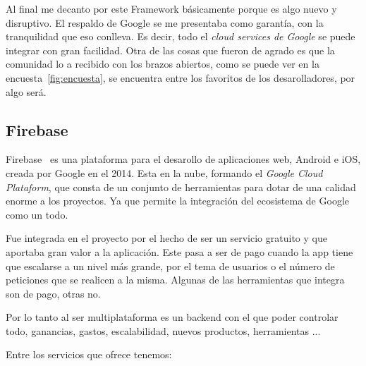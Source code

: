 Al final me decanto por este Framework básicamente porque es algo nuevo y disruptivo. El respaldo de Google se me presentaba como garantía, con la tranquilidad que eso conlleva. Es decir, todo el \emph{cloud services de Google} se puede integrar con gran facilidad.
Otra de las cosas que fueron de agrado es que la comunidad lo a recibido con los brazos abiertos, como se puede ver en la encuesta~\ref{fig:encuesta}, se encuentra entre los favoritos de los desarolladores, por algo será.

\subsection{Firebase}
Firebase~\cite{wiki:firebase} es una plataforma para el desarollo de aplicaciones web, Android e iOS, creada por Google en el 2014. Esta en la nube, formando el \emph{Google Cloud Plataform}, que consta de un conjunto de herramientas para dotar de una calidad enorme a los proyectos. Ya que permite la integración del ecosistema de Google como un todo.

Fue integrada en el proyecto por el hecho de ser un servicio gratuito y que aportaba gran valor a la aplicación. Este pasa a ser de pago cuando la app tiene que escalarse a un nivel más grande, por el tema de usuarios o el número de peticiones que se realicen a la misma. Algunas de las herramientas que integra son de pago, otras no.

Por lo tanto al ser multiplataforma es un backend con el que poder controlar todo, ganancias, gastos, escalabilidad, nuevos productos, herramientas ... 

Entre los servicios que ofrece tenemos:

